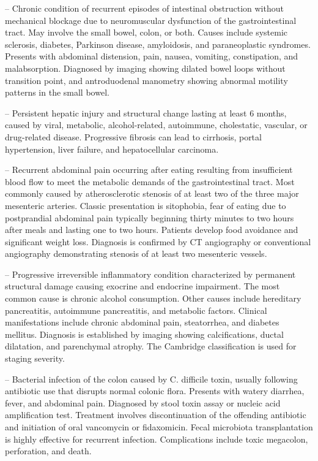 -- Chronic condition of recurrent episodes of intestinal obstruction without mechanical blockage due to neuromuscular dysfunction of the gastrointestinal tract. May involve the small bowel, colon, or both. Causes include systemic sclerosis, diabetes, Parkinson disease, amyloidosis, and paraneoplastic syndromes. Presents with abdominal distension, pain, nausea, vomiting, constipation, and malabsorption. Diagnosed by imaging showing dilated bowel loops without transition point, and antroduodenal manometry showing abnormal motility patterns in the small bowel.

-- Persistent hepatic injury and structural change lasting at least 6 months, caused by viral, metabolic, alcohol-related, autoimmune, cholestatic, vascular, or drug-related disease. Progressive fibrosis can lead to cirrhosis, portal hypertension, liver failure, and hepatocellular carcinoma.

-- Recurrent abdominal pain occurring after eating resulting from insufficient blood flow to meet the metabolic demands of the gastrointestinal tract. Most commonly caused by atherosclerotic stenosis of at least two of the three major mesenteric arteries. Classic presentation is sitophobia, fear of eating due to postprandial abdominal pain typically beginning thirty minutes to two hours after meals and lasting one to two hours. Patients develop food avoidance and significant weight loss. Diagnosis is confirmed by CT angiography or conventional angiography demonstrating stenosis of at least two mesenteric vessels.

-- Progressive irreversible inflammatory condition characterized by permanent structural damage causing exocrine and endocrine impairment. The most common cause is chronic alcohol consumption. Other causes include hereditary pancreatitis, autoimmune pancreatitis, and metabolic factors. Clinical manifestations include chronic abdominal pain, steatorrhea, and diabetes mellitus. Diagnosis is established by imaging showing calcifications, ductal dilatation, and parenchymal atrophy. The Cambridge classification is used for staging severity.

-- Bacterial infection of the colon caused by C. difficile toxin, usually following antibiotic use that disrupts normal colonic flora. Presents with watery diarrhea, fever, and abdominal pain. Diagnosed by stool toxin assay or nucleic acid amplification test. Treatment involves discontinuation of the offending antibiotic and initiation of oral vancomycin or fidaxomicin. Fecal microbiota transplantation is highly effective for recurrent infection. Complications include toxic megacolon, perforation, and death.

